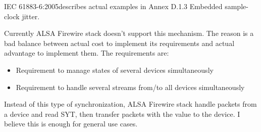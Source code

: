 \documentclass[onecolumn]{article}
\begin{document}
IEC 61883-6:2005\cite{iec61883-6-2}describes actual examples in Annex D.1.3 Embedded sample-clock jitter.

Currently ALSA Firewire stack doesn't support this mechanism. The reason is a bad balance between actual cost to implement its requirements and actual advantage to implement them. The requirements are:
\begin{itemize}
\item Requirement to manage states of several devices simultaneously
\item Requirement to handle several streams from/to all devices simultaneously
\end{itemize}

Instead of this type of synchronization, ALSA Firewire stack handle packets from a device and read SYT, then transfer packets with the value to the device. I believe this is enough for general use cases.

\newpage
\end{document}

